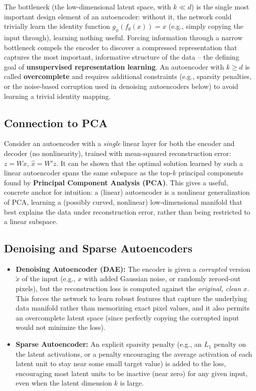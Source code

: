 \documentclass[12pt,a4paper]{article}
\begin{document}
\begin{keyidea}
The bottleneck (the low-dimensional latent space, with $k \ll d$) is the single most important design element of an autoencoder: without it, the network could trivially learn the identity function $g_\phi(f_\theta(x)) = x$ (e.g., simply copying the input through), learning nothing useful. Forcing information through a narrow bottleneck compels the encoder to discover a compressed representation that captures the most important, informative structure of the data -- the defining goal of \textbf{unsupervised representation learning}. An autoencoder with $k \geq d$ is called \textbf{overcomplete} and requires additional constraints (e.g., sparsity penalties, or the noise-based corruption used in denoising autoencoders below) to avoid learning a trivial identity mapping.
\end{keyidea}

\subsection{Connection to PCA}

\begin{example}
Consider an autoencoder with a \emph{single} linear layer for both the encoder and decoder (no nonlinearity), trained with mean-squared reconstruction error: $z = Wx$, $\hat x = W'z$. It can be shown that the optimal solution learned by such a linear autoencoder spans the same subspace as the top-$k$ principal components found by \textbf{Principal Component Analysis (PCA)}. This gives a useful, concrete anchor for intuition: a (linear) autoencoder is a nonlinear generalization of PCA, learning a (possibly curved, nonlinear) low-dimensional manifold that best explains the data under reconstruction error, rather than being restricted to a linear subspace.
\end{example}

\subsection{Denoising and Sparse Autoencoders}

\begin{itemize}[leftmargin=1.5em]
    \item \textbf{Denoising Autoencoder (DAE):} The encoder is given a \emph{corrupted} version $\tilde x$ of the input (e.g., $x$ with added Gaussian noise, or randomly zeroed-out pixels), but the reconstruction loss is computed against the \emph{original, clean} $x$. This forces the network to learn robust features that capture the underlying data manifold rather than memorizing exact pixel values, and it also permits an overcomplete latent space (since perfectly copying the corrupted input would not minimize the loss).
    \item \textbf{Sparse Autoencoder:} An explicit sparsity penalty (e.g., an $L_1$ penalty on the latent activations, or a penalty encouraging the average activation of each latent unit to stay near some small target value) is added to the loss, encouraging most latent units to be inactive (near zero) for any given input, even when the latent dimension $k$ is large.
\end{itemize}
\end{document}
